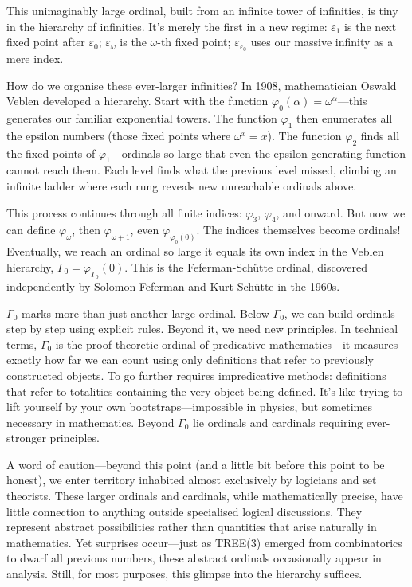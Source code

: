 This unimaginably large ordinal, built from an infinite tower of infinities, is tiny in the hierarchy of infinities. It's merely the first in a new regime:
$\varepsilon_1$ is the next fixed point after $\varepsilon_0$; $\varepsilon_\omega$ is the $\omega$-th fixed point; $\varepsilon_{\varepsilon_0}$ uses our \QSOpen{}massive\QSClose{} infinity as a mere index.

How do we organise these ever-larger infinities? In 1908, mathematician Oswald Veblen developed a hierarchy. Start with the function $\varphi_0(\alpha) = \omega^\alpha$—this generates our familiar exponential towers. The function $\varphi_1$ then enumerates all the epsilon numbers (those fixed points where $\omega^x = x$). The function $\varphi_2$ finds all the fixed points of $\varphi_1$—ordinals so large that even the epsilon-generating function cannot reach them. Each level finds what the previous level missed, climbing an infinite ladder where each rung reveals new unreachable ordinals above.

This process continues through all finite indices: $\varphi_3$, $\varphi_4$, and onward. But now we can define $\varphi_\omega$, then $\varphi_{\omega+1}$, even $\varphi_{\varphi_0(0)}$. The indices themselves become ordinals! Eventually, we reach an ordinal so large it equals its own index in the Veblen hierarchy, $\Gamma_0 = \varphi_{\Gamma_0}(0)$. This is the Feferman-Schütte ordinal, discovered independently by Solomon Feferman and Kurt Schütte in the 1960s.

$\Gamma_0$ marks more than just another large ordinal. Below $\Gamma_0$, we can build ordinals step by step using explicit rules. Beyond it, we need new principles. In technical terms, $\Gamma_0$ is the proof-theoretic ordinal of predicative mathematics—it measures exactly how far we can count using only definitions that refer to previously constructed objects. To go further requires impredicative methods: definitions that refer to totalities containing the very object being defined. It's like trying to lift yourself by your own bootstraps—impossible in physics, but sometimes necessary in mathematics. Beyond $\Gamma_0$ lie ordinals and cardinals requiring ever-stronger principles.

A word of caution—beyond this point (and a little bit before this point to be honest), we enter territory inhabited almost exclusively by logicians and set theorists. These larger ordinals and cardinals, while mathematically precise, have little connection to anything outside specialised logical discussions. They represent abstract possibilities rather than quantities that arise naturally in mathematics. Yet surprises occur—just as TREE(3) emerged from combinatorics to dwarf all previous numbers, these abstract ordinals occasionally appear in analysis. Still, for most purposes, this glimpse into the hierarchy suffices. 


